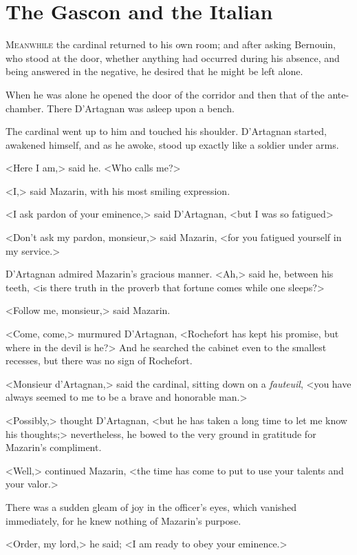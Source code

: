 \chapter{The Gascon and the Italian}

 \lettrine{M}{eanwhile} the cardinal returned to his own room; and after asking Bernouin, who stood at the door, whether anything had occurred during his absence, and being answered in the negative, he desired that he might be left alone.

When he was alone he opened the door of the corridor and then that of the ante-chamber. There D'Artagnan was asleep upon a bench.

The cardinal went up to him and touched his shoulder. D'Artagnan started, awakened himself, and as he awoke, stood up exactly like a soldier under arms.

<Here I am,> said he. <Who calls me?>

<I,> said Mazarin, with his most smiling expression.

<I ask pardon of your eminence,> said D'Artagnan, <but I was so fatigued\longdash>

<Don't ask my pardon, monsieur,> said Mazarin, <for you fatigued yourself in my service.>

D'Artagnan admired Mazarin's gracious manner. <Ah,> said he, between his teeth, <is there truth in the proverb that fortune comes while one sleeps?>

<Follow me, monsieur,> said Mazarin.

<Come, come,> murmured D'Artagnan, <Rochefort has kept his promise, but where in the devil is he?> And he searched the cabinet even to the smallest recesses, but there was no sign of Rochefort.

<Monsieur d'Artagnan,> said the cardinal, sitting down on a \textit{fauteuil}, <you have always seemed to me to be a brave and honorable man.>

<Possibly,> thought D'Artagnan, <but he has taken a long time to let me know his thoughts;> nevertheless, he bowed to the very ground in gratitude for Mazarin's compliment.

<Well,> continued Mazarin, <the time has come to put to use your talents and your valor.>

There was a sudden gleam of joy in the officer's eyes, which vanished immediately, for he knew nothing of Mazarin's purpose.

<Order, my lord,> he said; <I am ready to obey your eminence.>

